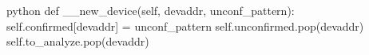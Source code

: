 \begin{mintedbox}{python}
def __new_device(self, devaddr, unconf_pattern):
    self.confirmed[devaddr] = unconf_pattern
    self.unconfirmed.pop(devaddr)
    self.to_analyze.pop(devaddr)
\end{mintedbox}
